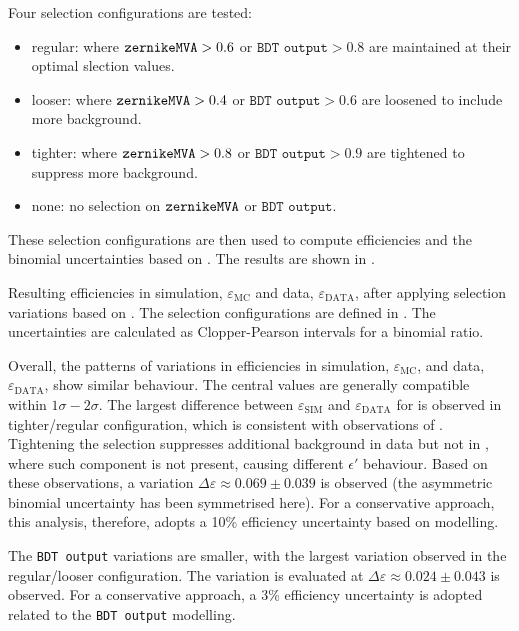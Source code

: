 Four selection configurations are tested:
\begin{itemize}
    \item regular: where ${\texttt{zernikeMVA}}>0.6$ or $\texttt{BDT~output}>0.8$ are maintained at their optimal slection values.
    \item looser: where ${\texttt{zernikeMVA}}>0.4$ or $\texttt{BDT~output}>0.6$ are loosened to include more background.
    \item tighter: where ${\texttt{zernikeMVA}}>0.8$ or $\texttt{BDT~output}>0.9$ are tightened to suppress more background.
    \item none: no selection on ${\texttt{zernikeMVA}}$ or $\texttt{BDT~output}$.
\end{itemize}
These selection configurations are then used to compute efficiencies and the binomial uncertainties based on .
The results are shown in .
\begin{table}[htbp!]
    \centering
    \caption{\label{tab:blinded_efficiency} 
    Resulting efficiencies in simulation, $\varepsilon_{\mathrm{MC}}$ and data, $\varepsilon_{\mathrm{DATA}}$,
    after applying selection variations based on 
    . 
    The selection configurations are defined in .
    The uncertainties are calculated as Clopper-Pearson intervals for a binomial ratio. 
    }
    
\end{table}

Overall, the patterns of variations in efficiencies in simulation, $\varepsilon_{\mathrm{MC}}$, and data, $\varepsilon_{\mathrm{DATA}}$, show similar behaviour.
The central values are generally compatible within $1\sigma-2\sigma$.
The largest difference between $\varepsilon_{\mathrm{SIM}}$ and $\varepsilon_{\mathrm{DATA}}$ for \ZMVA is observed in tighter/regular configuration, which is consistent with observations of .
Tightening the selection suppresses additional background in data but not in \MC, where such component is not present, causing different $\epsilon'$ behaviour.
Based on these observations, a variation $\Delta\varepsilon\approx0.069\pm0.039$ is observed
(the asymmetric binomial uncertainty has been symmetrised here).
For a conservative approach, this analysis, therefore, adopts a 10\% efficiency uncertainty based on \ZMVA modelling.

The \texttt{BDT~output} variations are smaller, with the largest variation observed in the regular/looser configuration.
The variation is evaluated at $\Delta\varepsilon\approx0.024\pm0.043$ is observed.
For a conservative approach, a 3\% efficiency uncertainty is adopted related to the \texttt{BDT~output} modelling.

